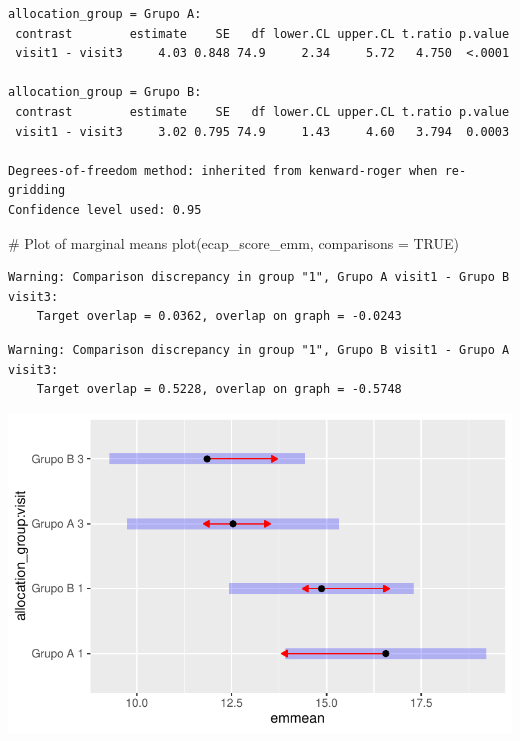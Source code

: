 \documentclass[
  letterpaper,
  DIV=11,
  numbers=noendperiod]{scrartcl}
\newenvironment{Shaded}{\begin{snugshade}}{\end{snugshade}}
\newcommand{\AttributeTok}[1]{\textcolor[rgb]{0.40,0.45,0.13}{#1}}
\newcommand{\CommentTok}[1]{\textcolor[rgb]{0.37,0.37,0.37}{#1}}
\newcommand{\ConstantTok}[1]{\textcolor[rgb]{0.56,0.35,0.01}{#1}}
\newcommand{\FunctionTok}[1]{\textcolor[rgb]{0.28,0.35,0.67}{#1}}
\newcommand{\NormalTok}[1]{\textcolor[rgb]{0.00,0.23,0.31}{#1}}
\begin{document}
\begin{verbatim}
allocation_group = Grupo A:
 contrast        estimate    SE   df lower.CL upper.CL t.ratio p.value
 visit1 - visit3     4.03 0.848 74.9     2.34     5.72   4.750  <.0001

allocation_group = Grupo B:
 contrast        estimate    SE   df lower.CL upper.CL t.ratio p.value
 visit1 - visit3     3.02 0.795 74.9     1.43     4.60   3.794  0.0003

Degrees-of-freedom method: inherited from kenward-roger when re-gridding 
Confidence level used: 0.95 
\end{verbatim}

\begin{Shaded}
\begin{Highlighting}[]
\CommentTok{\# Plot of marginal means}
\FunctionTok{plot}\NormalTok{(ecap\_score\_emm, }\AttributeTok{comparisons =} \ConstantTok{TRUE}\NormalTok{)}
\end{Highlighting}
\end{Shaded}

\begin{verbatim}
Warning: Comparison discrepancy in group "1", Grupo A visit1 - Grupo B visit3:
    Target overlap = 0.0362, overlap on graph = -0.0243
\end{verbatim}

\begin{verbatim}
Warning: Comparison discrepancy in group "1", Grupo B visit1 - Grupo A visit3:
    Target overlap = 0.5228, overlap on graph = -0.5748
\end{verbatim}

\includegraphics{Outcomes_V1V2V3_files/figure-pdf/ecap_score_sens_emm-1.pdf}
\end{document}
